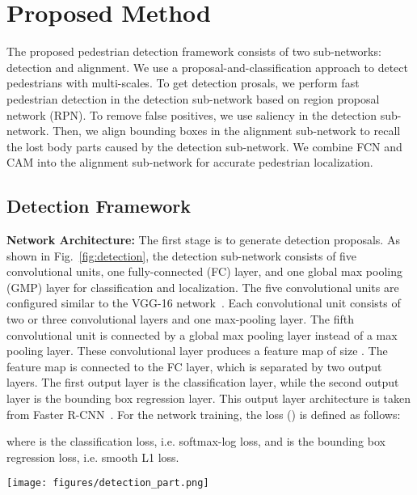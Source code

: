 \documentclass[journal]{IEEEtran}
\begin{document}
\section{Proposed Method}
\label{sec:ProposedMethod}
The proposed pedestrian detection framework consists of two sub-networks: detection and alignment. We use a proposal-and-classification approach to detect pedestrians with multi-scales. To get detection prosals, we perform fast pedestrian detection in the detection sub-network based on region proposal network (RPN). To remove false positives, we use saliency in the detection sub-network. Then, we align bounding boxes in the alignment sub-network to recall the lost body parts caused by the detection sub-network. We combine FCN and CAM into the alignment sub-network for accurate pedestrian localization.


\subsection{Detection Framework}
\label{subsec:DetectionFramework}

 \textbf{Network Architecture:} The first stage is to generate detection proposals. As shown in Fig.~\ref{fig:detection}, the detection sub-network consists of five convolutional units, one fully-connected (FC) layer, and one global max pooling (GMP) layer for classification and localization. The five convolutional units are configured similar to the VGG-16 network~\cite{simonyan2014very}. Each convolutional unit consists of two or three  convolutional layers and one max-pooling layer. The fifth convolutional unit is connected by a global max pooling layer instead of a max pooling layer. These convolutional layer produces a feature map of size . The feature map is connected to the FC layer, which is separated by two output layers. The first output layer is the classification layer, while the second output layer is the bounding box regression layer. This output layer architecture is taken from Faster R-CNN~\cite{ren2015faster}. For the network training, the loss () is defined as follows:



where  is the classification loss, i.e. softmax-log loss, and  is the bounding box regression loss, i.e. smooth L1 loss.


\begin{figure*}[t]
\centering
\centerline{\texttt{[image: figures/detection\_part.png]}}
\caption{Architecture of the proposed detection sub-network. }
\label{fig:detection}
\end{figure*}
\end{document}
